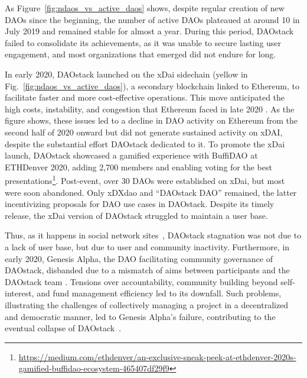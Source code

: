 \documentclass[10pt,lineno]{wlpeerj}
\begin{document}
As Figure~\ref{fig:ndaos_vs_active_daos} shows, despite regular creation of new DAOs since the beginning, the number of active DAOs plateaued at around 10 in July 2019 and remained stable for almost a year. During this period, DAOstack failed to consolidate its achievements, as it was unable to secure lasting user engagement, and most organizations that emerged did not endure for long. 



In early 2020, DAOstack launched on the xDai sidechain (yellow in Fig.~\ref{fig:ndaos_vs_active_daos}), a secondary blockchain linked to Ethereum, to facilitate faster and more cost-effective operations. This move anticipated the high costs, instability, and congestion that Ethereum faced in late 2020 \citep{jagati_eth_scalability,FaqirRhazoui2021}. As the figure shows, these issues led to a decline in DAO activity on Ethereum from the second half of 2020 onward but did not generate sustained activity on xDAI, despite the substantial effort DAOstack dedicated to it. 
To promote the xDai launch, DAOstack showcased a gamified experience with BuffiDAO at ETHDenver 2020, adding 2,700 members and enabling voting for the best presentations\footnote{\url{https://medium.com/ethdenver/an-exclusive-sneak-peek-at-ethdenver-2020s-gamified-buffidao-ecosystem-465407df29f9}}. Post-event, over 30 DAOs were established on xDai, but most were soon abandoned. Only xDXdao and ``DAOstack DAO'' remained, the latter incentivizing proposals for DAO use cases in DAOstack. Despite its timely release, the xDai version of DAOstack struggled to maintain a user base.

Thus, as it happens in social network sites~\citep{zhang_why_2015}, DAOstack stagnation was not due to a lack of user base, but due to user and community inactivity. Furthermore, in early 2020, Genesis Alpha, the DAO facilitating community governance of DAOstack, disbanded due to a mismatch of aims between participants and the DAOstack team \citep{genesis_thoughts}. Tensions over accountability, community building beyond self-interest, and fund management efficiency led to its downfall. Such problems, illustrating the challenges of collectively managing a project in a decentralized and democratic manner, led to Genesis Alpha’s failure, contributing to the eventual collapse of DAOstack~\citep{rachmany2020stateofdao}.
\end{document}
